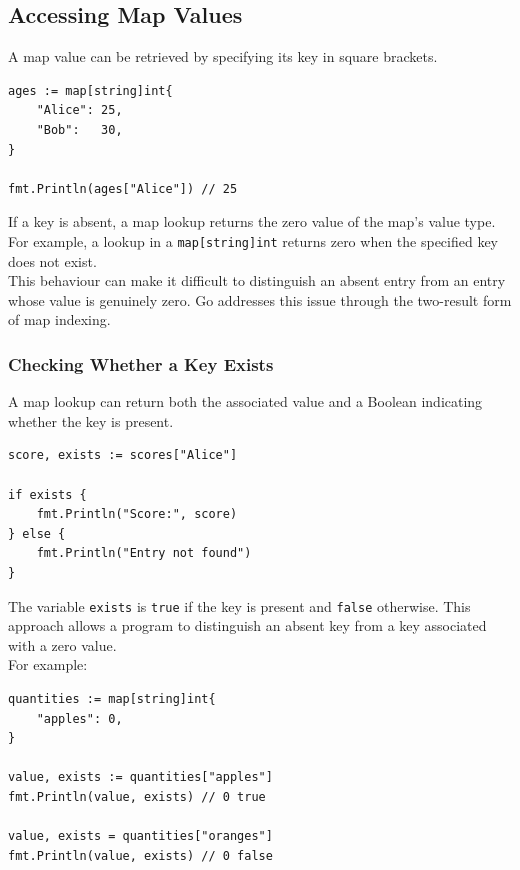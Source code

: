 \subsection{Accessing Map Values}

A map value can be retrieved by specifying its key in
square brackets.

\begin{lstlisting}
ages := map[string]int{
    "Alice": 25,
    "Bob":   30,
}

fmt.Println(ages["Alice"]) // 25
\end{lstlisting}

If a key is absent, a map lookup returns the zero value
of the map's value type. For example, a lookup in a
\texttt{map[string]int} returns zero when the specified
key does not exist.\\

This behaviour can make it difficult to distinguish an
absent entry from an entry whose value is genuinely zero.
Go addresses this issue through the two-result form of
map indexing.

\subsubsection{Checking Whether a Key Exists}

A map lookup can return both the associated value and
a Boolean indicating whether the key is present.

\begin{lstlisting}
score, exists := scores["Alice"]

if exists {
    fmt.Println("Score:", score)
} else {
    fmt.Println("Entry not found")
}
\end{lstlisting}

The variable \texttt{exists} is \texttt{true} if the key
is present and \texttt{false} otherwise. This approach
allows a program to distinguish an absent key from a
key associated with a zero value.\\

For example:

\begin{lstlisting}
quantities := map[string]int{
    "apples": 0,
}

value, exists := quantities["apples"]
fmt.Println(value, exists) // 0 true

value, exists = quantities["oranges"]
fmt.Println(value, exists) // 0 false
\end{lstlisting}

